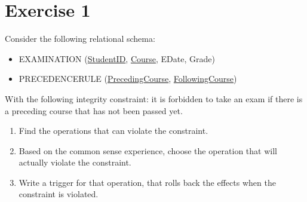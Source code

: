 \section{Exercise 1}

Consider the following relational schema: 
\begin{itemize}
    \item EXAMINATION (\underline{StudentID}, \underline{Course}, EDate, Grade)
    \item PRECEDENCERULE (\underline{PrecedingCourse}, \underline{FollowingCourse})
\end{itemize}
With the following integrity constraint: it is forbidden to take an exam if there is a preceding course that has not been passed yet.
\begin{enumerate}
    \item Find the operations that can violate the constraint.
    \item Based on the common sense experience, choose the operation that will actually violate the constraint. 
    \item Write a trigger for that operation, that rolls back the effects when the constraint is violated. 
\end{enumerate}

